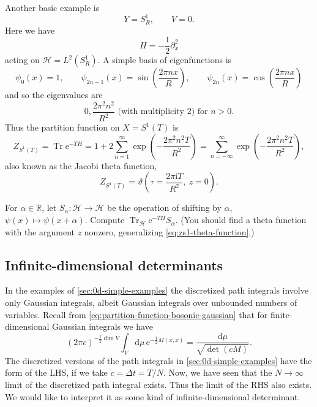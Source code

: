 \documentclass[12pt,letterpaper,reqno]{article}
\numberwithin{equation}{section}
\newcommand{\cH}{\ensuremath{\mathcal H}}
\newcommand{\R}{\ensuremath{\mathbb R}}
\newcommand{\half}{\ensuremath{\frac{1}{2}}}
\newcommand{\I}{{\mathrm i}}
\newcommand{\e}{{\mathrm e}}
\newcommand{\de}{\mathrm{d}}
\DeclareMathOperator{\Tr}{Tr}
\begin{document}
\begin{example} \label{exa:sigma-model-s1}
Another basic example is
\begin{equation}
  Y = S^1_R, \qquad V = 0.
\end{equation}
Here we have
\begin{equation}
  H = -\half \partial_x^2
\end{equation}
acting on $\cH = L^2(S^1_R)$. A simple basis of eigenfunctions is
\begin{equation}
  \psi_0(x) = 1, \qquad \psi_{2n-1}(x) = \sin\left(\frac{2 \pi n x}{R}\right), \qquad \psi_{2n}(x) = \cos\left(\frac{2 \pi n x}{R}\right)
\end{equation}
and so the eigenvalues are
\begin{equation}
  0, \frac{2 \pi^2 n^2}{R^2} \text{ (with multiplicity $2$) for $n > 0$}.
\end{equation}
Thus the partition function on $X = S^1(T)$ is
\begin{equation}
  Z_{S^1(T)} = \Tr \e^{-T H} = 1 + 2 \sum_{n=1}^\infty \exp\left(-\frac{2 \pi^2 n^2 T}{R^2}\right) = \sum_{n = -\infty}^\infty \exp\left(-\frac{2 \pi^2 n^2 T}{R^2}\right),
\end{equation}
also known as the Jacobi theta function,
\begin{equation} \label{eq:zs1-theta-function}
  Z_{S^1(T)} = \vartheta \left(\tau = \frac{2 \pi \I T}{R^2}, \ z = 0\right).
\end{equation}
\end{example}

\begin{exercise} For $\alpha \in \R$, let $S_\alpha: \cH \to \cH$ be the operation 
of shifting by $\alpha$, $\psi(x) \mapsto \psi(x + \alpha)$. Compute $\Tr_{\cH} \e^{-TH} S_\alpha$.
(You should find a theta function with the argument $z$ nonzero, generalizing \eqref{eq:zs1-theta-function}.)
\end{exercise}

\subsection{Infinite-dimensional determinants}

In the examples of \autoref{sec:0d-simple-examples} the discretized 
path integrals involve 
only Gaussian integrals, albeit Gaussian integrals over unbounded numbers of variables.
Recall from \eqref{eq:partition-function-bosonic-gaussian}
that for finite-dimensional Gaussian integrals we have
\begin{equation} \label{eq:partition-function-bosonic-gaussian-redux}
  (2\pi c)^{-\half \dim V} \int_{V} \de \mu \, \e^{-\half M(x,x)} = \frac{\de\mu}{\sqrt{\det (c M)}}.
\end{equation}
The discretized versions of the path integrals in \autoref{sec:0d-simple-examples}
have the form of the LHS, if we take $c = \Delta t = T/N$.
Now, we have seen that the $N \to \infty$ limit of the discretized path integral exists.
Thus the limit of the RHS also exists.
We would like to interpret it as some kind of infinite-dimensional
determinant.
\end{document}
